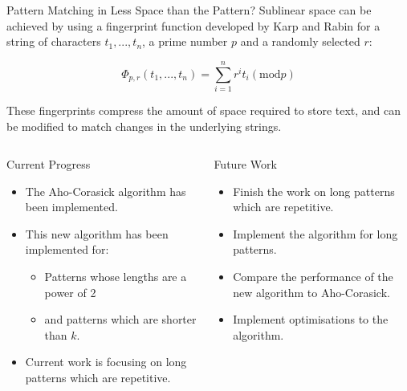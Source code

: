 \documentclass[ %
                    author={Dominic Moylett},
                supervisor={Dr. Raphael Clifford and Dr. Benjamin Sach},
                    degree={MEng},
                     title={Dictionary Matching with Fingerprints},
                  subtitle={},
                      type={Research},
                      year={2015} ]{poster}
\begin{document}
\begin{frame}{}
\begin{columns}[t]
  \begin{column}{0.422\linewidth}
  \begin{block}{\Large Pattern Matching in Less Space than the Pattern?}
  Sublinear space can be achieved by using a fingerprint function developed by Karp and Rabin for a string of characters $t_1,...,t_n$, a prime number $p$ and a randomly selected $r$:

  $$\Phi_{p, r}(t_1,...,t_n) = \sum_{i = 1}^{n}r^it_i (\text{mod} p)$$

  These fingerprints compress the amount of space required to store text, and can be modified to match changes in the underlying strings.
  \end{block}
  \end{column}
\end{columns}

\vfill

\begin{columns}[t]
  \begin{column}{0.422\linewidth}
  \begin{block}{\Large Current Progress}
  \begin{itemize}
  \item The Aho-Corasick algorithm has been implemented.
  \item This new algorithm has been implemented for:
    \begin{itemize}
    \item Patterns whose lengths are a power of 2
    \item and patterns which are shorter than $k$.
    \end{itemize}
  \item Current work is focusing on long patterns which are repetitive.
  \end{itemize}
  \end{block}
  \end{column}
  \begin{column}{0.422\linewidth}
  \begin{block}{\Large Future Work}
  \begin{itemize}
  \item Finish the work on long patterns which are repetitive.
  \item Implement the algorithm for long patterns.
  \item Compare the performance of the new algorithm to Aho-Corasick.
  \item Implement optimisations to the algorithm.
  \end{itemize}
  \end{block}
  \end{column}
\end{columns}

\vfill

\end{frame}

\end{document}
